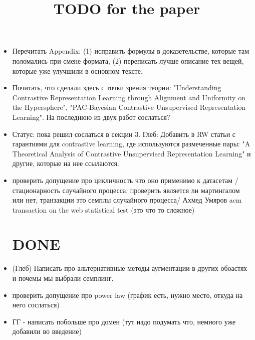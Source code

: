 \documentclass{article}
\title{TODO for the paper}
\author{}
\begin{document}
\maketitle

\begin{itemize}

\section{TODO}

\item Перечитать Appendix: (1) исправить формулы в доказетельстве, которые там поломались при смене формата, (2) переписать лучше описание тех вещей, которые уже улучшили в основном тексте.

\item Почитать, что сделали здесь с точки зрения теории: "Understanding Contrastive Representation Learning through Alignment and Uniformity on the Hypersphere", "PAC-Bayesian Contrastive Unsupervised Representation Learning". На последнюю из двух работ сослаться?

\item Статус:  пока решил сослаться в секции 3. Глеб: Добавить в RW статьи с гарантиями для contrastive learning, где используются размеченные пары: "A Theoretical Analysis of Contrastive Unsupervised Representation Learning" и другие, которые на нее ссылаются.


\item проверить допущение про цикличность что оно применимо к датасетам / стационарность случайного процесса, проверить является ли мартингалом или нет, транзакции это семплы случайного процесса/ Ахмед Умяров  acm transaction on the web statistical test (это что то сложное)

\section{DONE}

\item (Глеб) Написать про альтернативные методы аугментации в других обоастях и почемы мы выбрали семплинг.


\item проверить допущение про power law (график есть, нужно место, откуда на него сослаться)


\item ГГ - написать побольше про домен (тут надо подумать что, немного уже добавили во введение)



\end{itemize}
\end{document}
